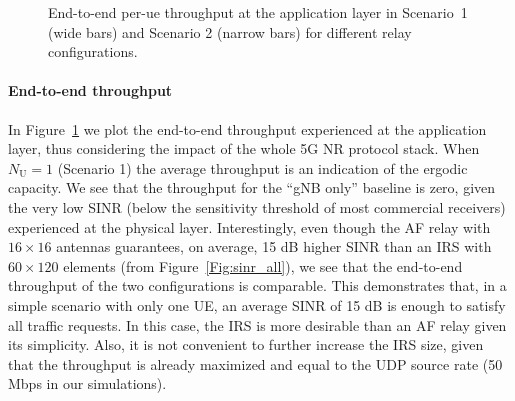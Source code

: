 

\begin{figure}
	\centering
	\setlength{}
	\setlength{}
	
	\caption{End-to-end per-\gls{ue} throughput at the application layer in Scenario~1 (wide bars) and Scenario 2 (narrow bars) for different relay configurations.}
	\label{fig:throughput}
\end{figure}


\paragraph{End-to-end throughput}
In Figure~\ref{fig:throughput} we plot the end-to-end throughput experienced at the application layer, thus considering the impact of the whole 5G NR protocol stack.
When $N_{\mathrm U}=1$ (Scenario 1) the average throughput is an indication of the ergodic capacity.
We see that the throughput for the ``gNB only'' baseline is zero, given the very low SINR (below the sensitivity threshold of most commercial receivers) experienced at the physical layer. 
Interestingly, even though the AF relay with $16\times 16$ antennas guarantees, on average, 15 dB higher SINR than an IRS with $60\times120$ elements (from Figure~\ref{Fig:sinr_all}), we see that the end-to-end throughput of the two configurations is comparable. 
This demonstrates that, in a simple scenario with only one UE, an average SINR of 15 dB is enough to satisfy all traffic requests. 
In this case, the IRS is more desirable than an AF relay given its simplicity. Also, it is not convenient to further increase the IRS size, given that the throughput is already maximized and equal to the UDP source rate (50 Mbps in our simulations).


